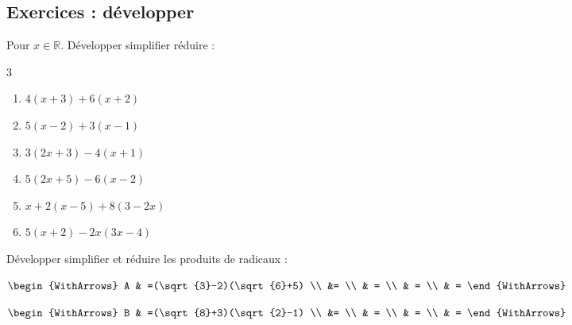 %	 


\newpage 
{}  
\pagestyle{scrheadings} %
\onehalfspacing
\subsection{Exercices : développer}
\begin{exercise} \label{chap02:exo:developper:niveau1} Pour $x\in\mathbb{R}$. Développer simplifier réduire :
	\begin{multicols}{3}
		\begin{enumerate}[label={$\Alph*=$},leftmargin=*]
			\item$4\left(x+3\right)+6(x+2)$
			\item$5\left(x-2\right)+3(x-1)$
			\item$3\left(2x+3\right)-4(x+1)$
			\item$5\left(2x+5\right)-6(x-2)$
			\item$x+2(x-5)+8(3-2x)$ 
			\item$5(x+2)-2x(3x-4)$
		\end{enumerate}
	\end{multicols} 
\end{exercise}
\begin{example}[Je fais] Développer simplifier et réduire les produits de radicaux :
 
\noindent \parbox{0.45\linewidth}{	
	$\begin{WithArrows}
		A & =(\sqrt{3}-2)(\sqrt{6}+5) \\
		&=  \\
		& =   \\
		& =  \\
		& =  
	\end{WithArrows}$ 	
}\hfill \parbox{0.45\linewidth}{	
	$\begin{WithArrows}
		B & =(\sqrt{8}+3)(\sqrt{2}-1)  \\
		&=  \\
		& =   \\
		& =  \\
		& =  
	\end{WithArrows}$ 
}
\end{example}
